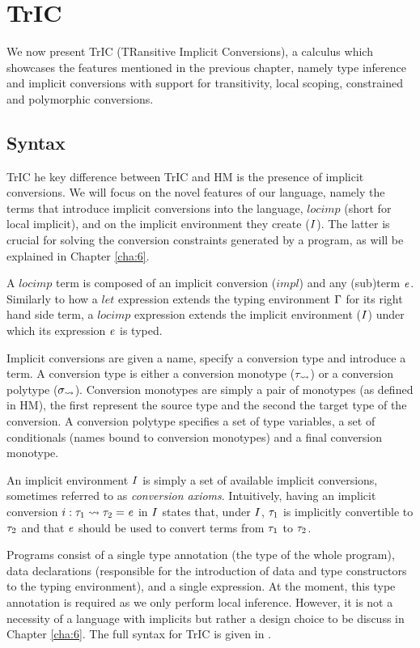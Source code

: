 \chapter{TrIC}
\label{cha:5}

We now present TrIC (TRansitive Implicit Conversions), a calculus which showcases the features mentioned in the previous chapter, namely type inference and implicit conversions with support for transitivity, local scoping, constrained and polymorphic conversions.

\section{Syntax}
TrIC he key difference between TrIC and HM is the presence of implicit conversions. We will focus on the novel features of our language, namely the terms that introduce implicit conversions into the language, $locimp$ (short for local implicit), and on the implicit environment they create ($I$). The latter is crucial for solving the conversion constraints generated by a program, as will be explained in Chapter \ref{cha:6}.

A $locimp$ term is composed of an implicit conversion ($impl$) and any (sub)term $\mathit{e}$. Similarly to how a $let$ expression extends the typing environment $\Gamma$ for its right hand side term, a $locimp$ expression extends the implicit environment ($I$) under which its expression $\mathit{e}$ is typed. 

Implicit conversions are given a name, specify a conversion type and introduce a term. A conversion type is either a conversion monotype ($\mathit{\tau_{\rightsquigarrow}}$) or a conversion polytype ($\mathit{\sigma_{\rightsquigarrow}}$). Conversion monotypes are simply a pair of monotypes (as defined in HM), the first represent the source type and the second the target type of the conversion. A conversion polytype specifies a set of type variables, a set of conditionals (names bound to conversion monotypes) and a final conversion monotype. 

An implicit environment $I$ is simply a set of available implicit conversions, sometimes referred to as \textit{conversion axioms}. Intuitively, having an implicit conversion $i : \mathit{\tau}_1 \rightsquigarrow \mathit{\tau}_2 = \mathit{e}$ in $I$ states that, under $I$, $\mathit{\tau}_1$ is implicitly convertible to $\mathit{\tau}_2$ and that $\mathit{e}$ should be used to convert terms from $\mathit{\tau}_1$ to $\mathit{\tau}_2$.

Programs consist of a single type annotation (the type of the whole program), data declarations (responsible for the introduction of data and type constructors to the typing environment), and a single expression. At the moment, this type annotation is required as we only perform local inference. However, it is not a necessity of a language with implicits but rather a design choice to be discuss in Chapter \ref{cha:6}. The full syntax for TrIC is given in .

